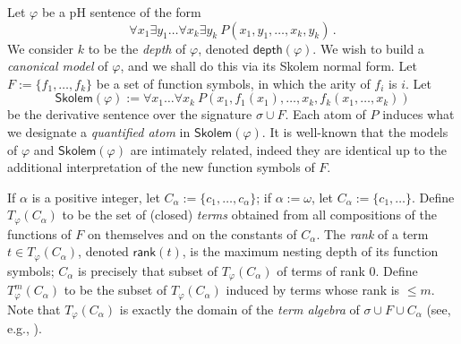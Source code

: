 \documentclass{LMCS}
\newcommand{\rank}[0]{\ensuremath{\mathsf{rank}}}
\newcommand{\depth}[0]{\ensuremath{\mathsf{depth}}}
\newcommand{\skolem}[0]{\ensuremath{\mathsf{Skolem}}}
\begin{document}
Let $\varphi$ be a pH sentence of the form 
\[\forall x_1 \exists y_1 \ldots \forall x_k \exists y_k\ P(x_1,y_1,\ldots,x_k,y_k)\,.\]
We consider $k$ to be the \emph{depth} of $\varphi$, denoted $\depth(\varphi)$. We wish to build a \emph{canonical model} of $\varphi$, and we shall do this via its Skolem normal form. Let $F:=\{f_1,\ldots,f_k\}$ be a set of function symbols, in which the arity of $f_i$ is $i$. Let 
\[ \skolem(\varphi) :=\forall x_1 \ldots \forall x_k \ P(x_1,f_1(x_1),\ldots,x_k,f_k(x_1,\ldots,x_k))\]
be the derivative sentence over the signature $\sigma \cup F$. Each atom of $P$ induces what we designate a \emph{quantified atom} in $\skolem(\varphi)$. It is well-known that the models of $\varphi$ and $\skolem(\varphi)$ are intimately related, indeed they are identical up to the additional interpretation of the new function symbols of $F$.

If $\alpha$ is a positive integer, let $C_\alpha:=\{c_1,\ldots,c_\alpha\}$; if $\alpha:=\omega$, let $C_\alpha:=\{c_1,\ldots \}$. 
Define $T_\varphi(C_\alpha)$ to be the set of (closed) \emph{terms} obtained from all compositions of the functions of $F$ on themselves and on the constants of $C_\alpha$. The \emph{rank} of a term $t \in T_\varphi(C_\alpha)$, denoted $\rank(t)$, is the maximum nesting depth of its function symbols; $C_\alpha$ is precisely that subset of $T_\varphi(C_\alpha)$ of terms of rank $0$. Define $T^m_\varphi(C_\alpha)$ to be the subset of $T_\varphi(C_\alpha)$ induced by terms whose rank is $\leq m$.
Note that $T_\varphi(C_\alpha)$ is exactly the domain of the \emph{term algebra} of $\sigma \cup F \cup C_\alpha$ (see, e.g., \cite{Hodges}).
\end{document}
